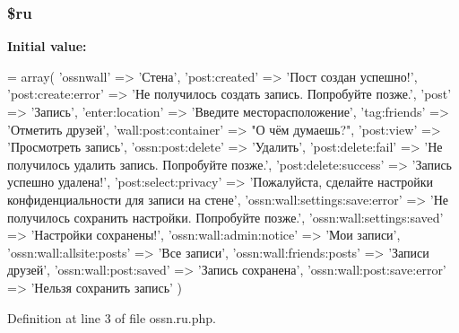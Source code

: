 \subsubsection[{\texorpdfstring{\$ru}{$ru}}]{\setlength{\rightskip}{0pt plus 5cm}\$ru}\hypertarget{components_2_ossn_wall_2locale_2ossn_8ru_8php_aab84a3feda2b0e489cac7cd194e8d726}{}\label{components_2_ossn_wall_2locale_2ossn_8ru_8php_aab84a3feda2b0e489cac7cd194e8d726}
{\bfseries Initial value\+:}
\begin{DoxyCode}
= array(
        \textcolor{stringliteral}{'ossnwall'} => \textcolor{stringliteral}{'Стена'},
        \textcolor{stringliteral}{'post:created'} => \textcolor{stringliteral}{'Пост создан успешно!'},
        \textcolor{stringliteral}{'post:create:error'} => \textcolor{stringliteral}{'Не получилось создать запись. Попробуйте позже.'},
        \textcolor{stringliteral}{'post'} => \textcolor{stringliteral}{'Запись'},
        \textcolor{stringliteral}{'enter:location'} => \textcolor{stringliteral}{'Введите месторасположение'},
        \textcolor{stringliteral}{'tag:friends'} => \textcolor{stringliteral}{'Отметить друзей'},
        \textcolor{stringliteral}{'wall:post:container'} => \textcolor{stringliteral}{"О чём думаешь?"},
        \textcolor{stringliteral}{'post:view'} => \textcolor{stringliteral}{'Просмотреть запись'},
        \textcolor{stringliteral}{'ossn:post:delete'} => \textcolor{stringliteral}{'Удалить'},
        \textcolor{stringliteral}{'post:delete:fail'} => \textcolor{stringliteral}{'Не получилось удалить запись. Попробуйте позже.'},
        \textcolor{stringliteral}{'post:delete:success'} => \textcolor{stringliteral}{'Запись успешно удалена!'},
        \textcolor{stringliteral}{'post:select:privacy'} => \textcolor{stringliteral}{'Пожалуйста, сделайте настройки конфиденциальности для записи на стене'},
        \textcolor{stringliteral}{'ossn:wall:settings:save:error'} => \textcolor{stringliteral}{'Не получилось сохранить настройки. Попробуйте позже.'},
        \textcolor{stringliteral}{'ossn:wall:settings:saved'} => \textcolor{stringliteral}{'Настройки сохранены!'},
        \textcolor{stringliteral}{'ossn:wall:admin:notice'} => \textcolor{stringliteral}{'Мои записи'},
        \textcolor{stringliteral}{'ossn:wall:allsite:posts'} => \textcolor{stringliteral}{'Все записи'},
        \textcolor{stringliteral}{'ossn:wall:friends:posts'} => \textcolor{stringliteral}{'Записи друзей'},
        \textcolor{stringliteral}{'ossn:wall:post:saved'} => \textcolor{stringliteral}{'Запись сохранена'},
        \textcolor{stringliteral}{'ossn:wall:post:save:error'} => \textcolor{stringliteral}{'Нельзя сохранить запись'}
)
\end{DoxyCode}


Definition at line 3 of file ossn.\+ru.\+php.

